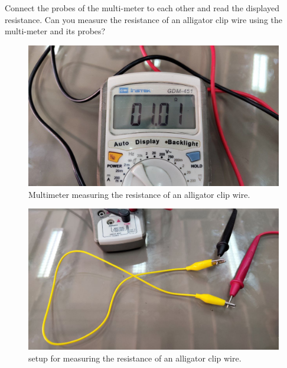 \documentclass[11pt]{article}
\newcommand{\PicScale}{0.2}
\begin{document}
\begin{question}
\begin{subquestion}{Connect the probes of the multi-meter to each other and read the displayed resistance. Can you measure the resistance of an alligator clip wire using the multi-meter and its probes? }
{    \begin{figure}[H]
        \begin{center}
            \includegraphics[scale=\PicScale]{Fig/53.jpeg}
            \caption{Multimeter measuring the resistance of an alligator clip wire.}
        \end{center}
    \end{figure}

    \begin{figure}[H]
        \begin{center}
            \includegraphics[scale=\PicScale]{Fig/54.jpeg}
            \caption{setup for measuring the resistance of an alligator clip wire.}
        \end{center}
    \end{figure}
}
\end{subquestion}

\end{question}


\end{document}
